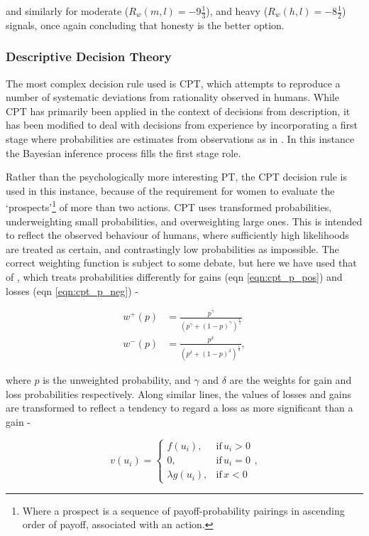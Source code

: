 and similarly for moderate (\(R_{w}(m,l)=-9\frac{1}{3}\)), and heavy (\(R_{w}(h,l)=-8\frac{1}{2}\)) signals, once again concluding that honesty is the better option.

\subsubsection{Descriptive Decision Theory}

The most complex decision rule used is \ac{CPT}, which attempts to reproduce a number of systematic deviations from rationality observed in humans. While \ac{CPT} has primarily been applied in the context of decisions from description, it has been modified to deal with decisions from experience by incorporating a first stage where probabilities are estimates from observations as in \cite{FoxCPT}. In this instance the Bayesian inference process fills the first stage role.

Rather than the psychologically more interesting \ac{PT}, the \ac{CPT}
decision rule is used in this instance, because of the requirement
for women to evaluate the `prospects'\footnote{Where a prospect is a sequence of payoff-probability pairings in ascending order of payoff, associated with an action.} of more than two actions. \ac{CPT} uses transformed probabilities, underweighting
small probabilities, and overweighting large ones. This is intended to reflect the observed behaviour of humans, where sufficiently high likelihoods are treated as certain, and contrastingly low probabilities as impossible. The correct weighting function is subject to some debate, but here we have used that of \citet{Tversky1992}, which treats probabilities differently for gains (eqn \ref{eqn:cpt_p_pos}) and losses (eqn \ref{eqn:cpt_p_neg}) -

\begin{align}
w^{+}(p) & = \frac{p^{\gamma}}{(p^{\gamma}+(1-p)^{\gamma})^{\frac{1}{\gamma}}}\label{eqn:cpt_p_pos}\\
w^{-}(p) & = \frac{p^{\delta}}{(p^{\delta}+(1-p)^{\delta})^{\frac{1}{\delta}}}\label{eqn:cpt_p_neg},
\end{align}


where $p$ is the unweighted probability, and $\gamma$ and $\delta$
are the weights for gain and loss probabilities respectively. Along similar lines, the values of losses and gains are transformed to reflect a tendency to regard a loss as more significant than a gain  -

\begin{equation}
v(u_{i})=\begin{cases}
f(u_{i}),& \text{if}\, u_{i}>0\\
0,& \text{if}\, u_{i}=0\\
\lambda g(u_{i}),& \text{if}\, x<0
\end{cases},
\end{equation}


